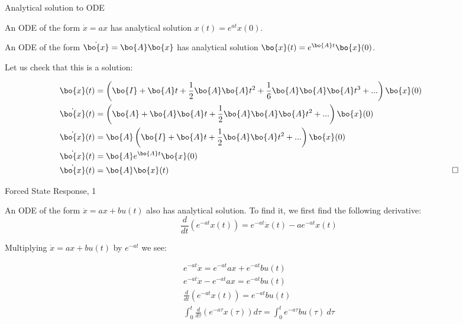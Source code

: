 \documentclass{beamer}
\begin{document}
\begin{frame}{Analytical solution to ODE}
	\begin{flushleft}
		
		An ODE of the form $\dot x = a x$ has analytical solution $x(t) = e^{at} x(0)$.
		
		\bigskip
		
		An ODE of the form $\dot{\bo{x}} = \bo{A}  \bo{x}$ has analytical solution $\bo{x}(t) = e^{\bo{A}t}  \bo{x}(0)$.
		
		\bigskip
		
		Let us check that this is a solution:
		
		\begin{align}
			\bo{x}(t) &= \left( \bo{I}+\bo{A}t+\frac{1}{2} \bo{A}\bo{A}t^2
			+\frac{1}{6} \bo{A}\bo{A}\bo{A}t^3 + ... \right)  \bo{x}(0) &
			\\
			\dot{\bo{x}}(t) &= \left( \bo{A}+\bo{A}\bo{A}t
			+\frac{1}{2}\bo{A}\bo{A}\bo{A}t^2 + ... \right)  \bo{x}(0) 	&		
			\\
			\dot{\bo{x}}(t) &= \bo{A} \left(\bo{I} +\bo{A}t
			+\frac{1}{2}\bo{A}\bo{A}t^2 + ... \right)  \bo{x}(0) 	&		
			\\
			\dot{\bo{x}}(t) &= \bo{A} e^{\bo{A}t}  \bo{x}(0) 	&		 			
			\\
			\dot{\bo{x}}(t) &= \bo{A} \bo{x}(t)  &\ \ \qed
		\end{align}
		
		
		
	\end{flushleft}
\end{frame}



\begin{frame}{Forced State Response, 1}
	\begin{flushleft}
		
		An ODE of the form $\dot x = a x + bu(t)$ also has analytical solution. To find it, we first find the following derivative:
		\begin{equation}
			\frac{d}{dt} \left( e^{-at} x(t) \right) = e^{-at} \dot x(t) - a e^{-at} x(t)
		\end{equation}
		
		Multiplying $\dot x = a x + bu(t)$ by $e^{-at}$ we see:
		
		\begin{align}
			e^{-at} \dot x = e^{-at} a x + e^{-at} bu(t)
			\\
			e^{-at} \dot x -  e^{-at} a x= e^{-at} bu(t)
			\\
			\frac{d}{dt} \left( e^{-at} x(t) \right) = e^{-at} bu(t)
			\\
			\int_{0}^{t} \frac{d}{d\tau} \left( e^{-a\tau} x(\tau) \right)  d\tau = 	\int_{0}^{t}  e^{-a\tau} bu(\tau) \ d\tau
		\end{align}
		
		
		
	\end{flushleft}
\end{frame}
\end{document}
